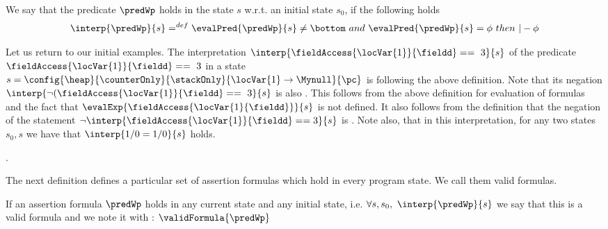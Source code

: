 \begin{interpretation} \label{interpPred}
We say that the predicate $\predWp$  holds  in the state $s$  w.r.t. an initial state $s_0$, if the following holds
$$   \interp{\predWp}{s} =^{def} \evalPred{\predWp}{s}  \neq  \bottom  \ and \  \evalPred{\predWp}{s} = \phi  \ then \ |- \phi    $$ 

\end{interpretation}

Let us return to our initial examples. The interpretation $\interp{\fieldAccess{\locVar{1}}{\fieldd} ==~3}{s}$
 of the predicate $\fieldAccess{\locVar{1}}{\fieldd} ==~3$ in a state  $s =\config{\heap}{\counterOnly}{ \stackOnly }{\locVar{1} \rightarrow \Mynull  }{\pc } $ 
is \true{} following the above definition. Note that its negation  $\interp{\neg (\fieldAccess{\locVar{1} }{\fieldd} ==~3}{s}$
is also \true. This follows from the above definition for evaluation of formulas and the fact that
 $ \evalExp{\fieldAccess{\locVar{1}{\fieldd}  }}{ s}  $ is not defined.
 It also follows from the definition that the negation of the statement $ \neg \interp{\fieldAccess{\locVar{1} }{\fieldd} == 3 }{s}$ is \false. 
Note also, that in this interpretation, for any two states $s_0, s$ we have that $ \interp{1/0 = 1/0}{s}$ holds. 


.

 




The next definition defines a particular set of assertion formulas which  hold in every program state. We call them  valid formulas. 
\begin{interpretation}\label{assertLang:interpretation:valid}
  If an assertion formula  $ \predWp $ holds in any current state and any initial state, i.e.
$\forall s, s_{0}, \  \interp{\predWp}{s} $ we say that this is a valid formula and we note it with :
  $\validFormula{\predWp} $ 
\end{interpretation}
